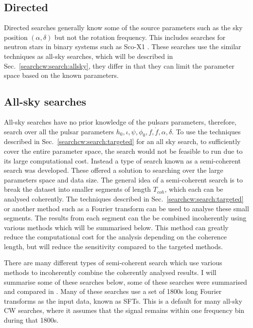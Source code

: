 \subsection{\label{searchcw:search:directed}Directed}
Directed searches generally know some of the source parameters such as the sky position $(\alpha,\delta)$ but not the rotation frequency. This includes searches for neutron stars in binary systems such as Sco-X1 \citep{abbott2017UpperLimits,meadors2016TuningScorpius}.
These searches use the similar techniques as all-sky searches, which will be described in Sec.~\ref{searchcw:search:allsky}, they differ in that they can limit the parameter space based on the known parameters.

\subsection{\label{searchcw:search:allsky}All-sky searches}

All-sky searches have no prior knowledge of the pulsars parameters, therefore, search over all the pulsar parameters $h_0, \iota, \psi, \phi_0, f, \dot{f}, \alpha, \delta$.
To use the techniques described in Sec.~\ref{searchcw:search:targeted} for an all sky search, to sufficiently cover the entire parameter space, the search would not be feasible to run due to its large computational cost.
Instead a type of search known as a semi-coherent search was developed.
These offered a solution to searching over the large parameters space and data size. 
The general idea of a semi-coherent search is to break the dataset into smaller segments of length $T_{coh}$, which each can be analysed coherently.
The techniques described in Sec.~\ref{searchcw:search:targeted} or another method such as a Fourier transform can be used to analyse these small segments.
The results from each segment can the be combined incoherently using various methods which will be summarised below.
This method can greatly reduce the computational cost for the analysis depending on the coherence length, but will reduce the sensitivity compared to the targeted methods. 

There are many different types of semi-coherent search which use various methods to incoherently combine the coherently analysed results. 
I will summarise some of these searches below, some of these searches were summarised and compared in \citep{walsh2016ComparisonMethods}.
Many of these searches use a set of 1800s long Fourier transforms as the input data, known as \glspl{SFT}. This is a default for many all-sky \gls{CW} searches, where it assumes that the signal remains within one frequency bin during that 1800s.


